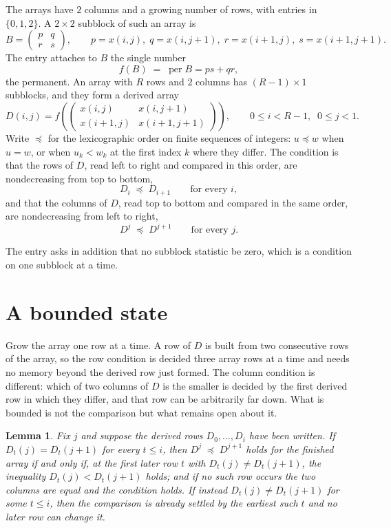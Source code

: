 \documentclass[11pt,a4paper]{article}
\theoremstyle{plain}
\newtheorem{lemma}[theorem]{Lemma}
\theoremstyle{definition}
\begin{document}
The arrays have $2$ columns and a growing number of rows, with entries in $\{0,1,2\}$. A
$2\times2$ subblock of such an array is
\[
B=\begin{pmatrix} p & q \\ r & s \end{pmatrix},
\qquad p=x(i,j),\; q=x(i,j+1),\; r=x(i+1,j),\; s=x(i+1,j+1).
\]
The entry attaches to $B$ the single number
\[
f(B)\;=\;\operatorname{per}B=ps+qr,
\]
the permanent. An array with $R$ rows and $2$ columns has $(R-1)\times1$ subblocks, and they
form a derived array
\[
D(i,j)=f\!\left(\begin{pmatrix} x(i,j) & x(i,j+1) \\ x(i+1,j) & x(i+1,j+1)\end{pmatrix}
\right),\qquad 0\le i<R-1,\;\; 0\le j<1 .
\]
Write $\preceq$ for the lexicographic order on finite sequences of integers: $u\preceq w$ when
$u=w$, or when $u_k<w_k$ at the first index $k$ where they differ. The condition is that the
rows of $D$, read left to right and compared in this order, are nondecreasing from top to bottom,
\[
D_{i}\;\preceq\;D_{i+1}\qquad\text{for every } i,
\]
and that the columns of $D$, read top to bottom and compared in the same order, are nondecreasing
from left to right,
\[
D^{j}\;\preceq\;D^{j+1}\qquad\text{for every } j .
\]

The entry asks in addition that no subblock statistic be zero, which is a condition on one subblock at a time.


\section{A bounded state}

Grow the array one row at a time. A row of $D$ is built from two consecutive rows of the array,
so the row condition is decided three array rows at a time and needs no memory beyond the
derived row just formed. The column condition is different: which of two columns of $D$ is the
smaller is decided by the first derived row in which they differ, and that row can be
arbitrarily far down. What is bounded is not the comparison but what remains open about it.

\begin{lemma}\label{lem:bits}
Fix $j$ and suppose the derived rows $D_0,\dots,D_i$ have been written. If $D_t(j)=D_t(j+1)$ for
every $t\le i$, then $D^{j}\;\preceq\;D^{j+1}$ holds for the finished array if and only if,
at the first later row $t$ with $D_t(j)\neq D_t(j+1)$, the inequality $D_t(j)<D_t(j+1)$
holds; and if no such row occurs the two columns are equal and the condition holds. If instead
$D_t(j)\neq D_t(j+1)$ for some $t\le i$, then the comparison is already settled by the earliest
such $t$ and no later row can change it.
\end{lemma}
\end{document}
